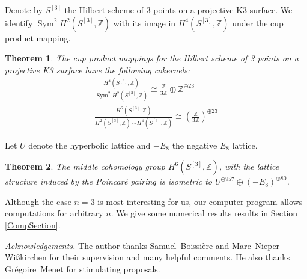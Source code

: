 \documentclass{amsart}
\DeclareMathOperator{\Sym}{Sym}
\newcommand{\hilb}[1]{^{[#1]}}
\newcommand{\IZ}{\mathbb{Z}}
\theoremstyle{plain}
\newtheorem{theorem}{Theorem}[section]
\theoremstyle{definition}
\theoremstyle{remark}
\begin{document}
Denote by $S\hilb{3}$ the Hilbert scheme of 3 points on a projective K3 surface. We identify $\Sym^2H^2(S\hilb{3},\IZ)$ with its image in $H^4(S\hilb{3},\IZ)$ under the cup product mapping. 
\begin{theorem}
The cup product mappings for the Hilbert scheme of 3 points on a projective K3 surface have the following cokernels:
\begin{gather}
\frac{H^4(S\hilb{3},\IZ)}{\Sym^2 H^2(S\hilb{3},\IZ)}  \cong \frac{\IZ}{3\IZ} \oplus \IZ^ {\oplus 23}\\
\frac{H^6(S\hilb{3},\IZ)}{H^2(S\hilb{3},\IZ)\smile H^4(S\hilb{3},\IZ)} \cong \left(\frac{\IZ}{3\IZ}\right)^{\oplus 23}
\end{gather}
\end{theorem}
Let $U$ denote the hyperbolic lattice and $-E_8$ the negative $E_8$ lattice.
\begin{theorem}
The middle cohomology group $H^6(S\hilb{3},\IZ)$, with the lattice structure induced by the Poincar\'{e} pairing is isometric to $U^{\oplus 957}\oplus (-E_8)^{\oplus 80}$.
\end{theorem}
Although the case $n=3$ is most interesting for us, our computer program allows computations for arbitrary $n$. We give some numerical results results in Section \ref{CompSection}.\vspace{5pt}

\emph{Acknowledgements.} The author thanks Samuel~Boissi\`ere and Marc~Nieper-Wi{\ss}kirchen for their supervision and many helpful comments. He also thanks Gr\'{e}goire~Menet for stimulating proposals.
\end{document}
